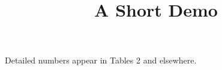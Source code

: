 \documentclass[article]{jss}
\title{A Short Demo}
\begin{document}
Detailed numbers appear in Tables 2 and elsewhere.
\end{document}
